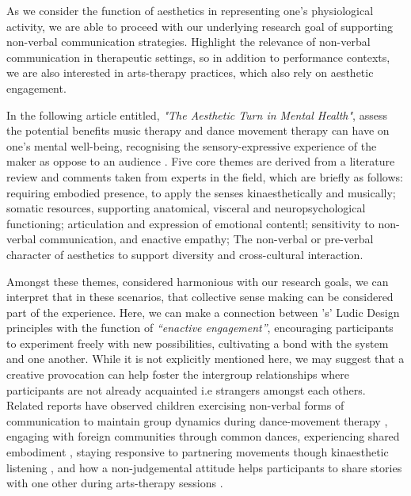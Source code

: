 As we consider the function of aesthetics in representing one's physiological activity, we are able to proceed with our underlying research goal of supporting non-verbal communication strategies. Highlight the relevance of non-verbal communication in therapeutic settings, so in addition to performance contexts, we are also interested in arts-therapy practices, which also rely on aesthetic engagement.

In the following article entitled, \textit{"The Aesthetic Turn in Mental Health"}, \citeauthor{samaritter_aesthetic_2018} assess the potential benefits music therapy and dance movement therapy can have on one's mental well-being, recognising the sensory-expressive experience of the maker as oppose to an audience \cite{samaritter_aesthetic_2018}. Five core themes are derived from a literature review and comments taken from experts in the field, which are briefly as follows: requiring embodied presence, to apply the senses kinaesthetically and musically; somatic resources, supporting anatomical, visceral and neuropsychological functioning; articulation and expression of emotional contentl; sensitivity to non-verbal communication, and enactive empathy; The non-verbal or pre-verbal character of aesthetics to support diversity and cross-cultural interaction.

Amongst these themes, considered harmonious with our research goals, we can interpret that in these scenarios, that collective sense making can be considered part of the experience. Here, we can make a connection between \citeauthor{gaver_drift_2004}'s' Ludic Design principles \cite{gaver_drift_2004} with the function of \textit{``enactive engagement''}, encouraging participants to experiment freely with new possibilities, cultivating a bond with the system and one another. While it is not explicitly mentioned here, we may suggest that a creative provocation can help foster the intergroup relationships where participants are not already acquainted i.e strangers amongst each others. Related reports have observed children exercising non-verbal forms of communication to maintain group dynamics during dance-movement therapy \cite{ylonen_kinaesthetic_2009}, engaging with foreign communities through common dances, experiencing shared embodiment \cite{hoppu_other_2013}, staying responsive to partnering movements though kinaesthetic listening \cite{ylonen_bodily_2003}, and how a non-judgemental attitude helps participants to share stories with one other during arts-therapy sessions \cite{kalmanowitz_out_2016}.

